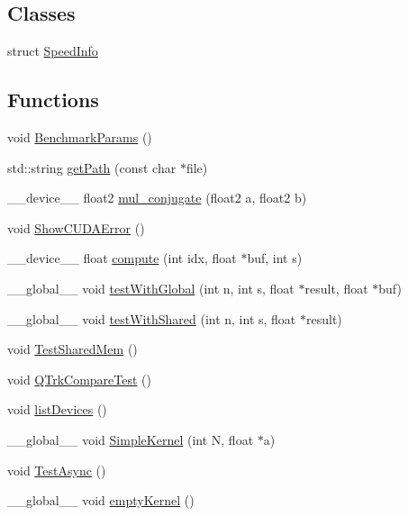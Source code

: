 \subsection*{Classes}
\begin{DoxyCompactItemize}
\item 
struct \hyperlink{struct_speed_info}{Speed\+Info}
\end{DoxyCompactItemize}
\subsection*{Functions}
\begin{DoxyCompactItemize}
\item 
void \hyperlink{test_8cu_aa2e677b0099389a9137abf21b6a11b61}{Benchmark\+Params} ()
\item 
std\+::string \hyperlink{test_8cu_ac9bbcd500f70faf6c53a4d2a805bddd0}{get\+Path} (const char $\ast$file)
\item 
\+\_\+\+\_\+device\+\_\+\+\_\+ float2 \hyperlink{test_8cu_a417f15fefe4dac05048eac1780fd902c}{mul\+\_\+conjugate} (float2 a, float2 b)
\item 
void \hyperlink{test_8cu_a5ec21c062fbb718eb272432b5473813a}{Show\+C\+U\+D\+A\+Error} ()
\item 
\+\_\+\+\_\+device\+\_\+\+\_\+ float \hyperlink{test_8cu_ab0b9205f1595a5487a58172abfab6925}{compute} (int idx, float $\ast$buf, int s)
\item 
\+\_\+\+\_\+global\+\_\+\+\_\+ void \hyperlink{test_8cu_a166bc95ca5b0b00fe336b75aff678668}{test\+With\+Global} (int n, int s, float $\ast$result, float $\ast$buf)
\item 
\+\_\+\+\_\+global\+\_\+\+\_\+ void \hyperlink{test_8cu_a21ef64381376f5cd30c6672775586241}{test\+With\+Shared} (int n, int s, float $\ast$result)
\item 
void \hyperlink{test_8cu_a7d13a69e192df853a4d4d9ecd28dbd62}{Test\+Shared\+Mem} ()
\item 
void \hyperlink{test_8cu_a72c3d946d0b5db06ff1a296d1eab3ec1}{Q\+Trk\+Compare\+Test} ()
\item 
void \hyperlink{test_8cu_a99990087b79839ab70fcf166fa1ee811}{list\+Devices} ()
\item 
\+\_\+\+\_\+global\+\_\+\+\_\+ void \hyperlink{test_8cu_a225b948eb316b51ce89ef78d73bf1114}{Simple\+Kernel} (int N, float $\ast$a)
\item 
void \hyperlink{test_8cu_a34793abe42580080c6393ec2b757d045}{Test\+Async} ()
\item 
\+\_\+\+\_\+global\+\_\+\+\_\+ void \hyperlink{test_8cu_ad9b2c50ca94fbb436128f97475148d84}{empty\+Kernel} ()

\end{DoxyCompactItemize}
